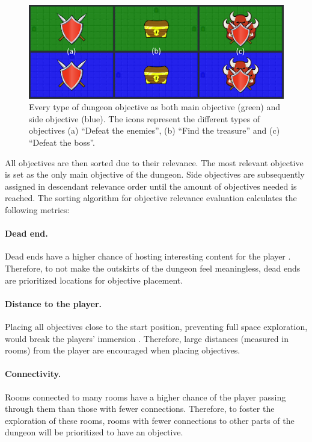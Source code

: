 \begin{figure}[]
  \centering 
  \includegraphics[width=\columnwidth]{included-papers-tex/paper-7/figures/objectives.png}
  \caption{Every type of dungeon objective as both main objective (green) and side objective (blue). The icons represent the different types of objectives (a) “Defeat the enemies”, (b) “Find the treasure” and (c) “Defeat the boss”.}
  \label{fig:objectives}
\end{figure}

All objectives are then sorted due to their relevance. The most relevant objective is set as the only main objective of the dungeon. Side objectives are subsequently assigned in descendant relevance order until the amount of objectives needed is reached. The sorting algorithm for objective relevance evaluation calculates the following metrics:

\paragraph*{Dead end.} Dead ends have a higher chance of hosting interesting content for the player . Therefore, to not make the outskirts of the dungeon feel meaningless, dead ends are prioritized locations for objective placement.

\paragraph*{Distance to the player.} Placing all objectives close to the start position, preventing full space exploration, would break the players’ immersion . Therefore, large distances (measured in rooms) from the player are encouraged when placing objectives. %

\paragraph*{Connectivity.} Rooms connected to many rooms have a higher chance of the player passing through them than those with fewer connections. Therefore, to foster the exploration of these rooms, rooms with fewer connections to other parts of the dungeon will be prioritized to have an objective.

